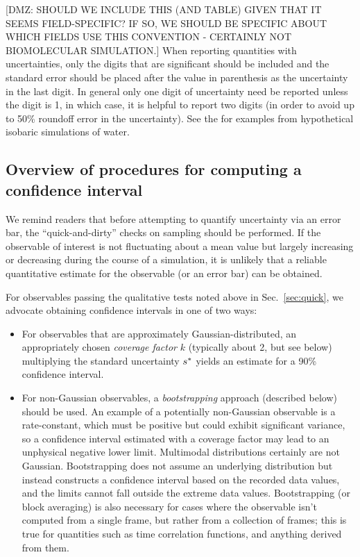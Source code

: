 [DMZ: SHOULD WE INCLUDE THIS (AND TABLE) GIVEN THAT IT SEEMS FIELD-SPECIFIC?  IF SO, WE SHOULD BE SPECIFIC ABOUT WHICH FIELDS USE THIS CONVENTION - CERTAINLY NOT BIOMOLECULAR SIMULATION.]
When reporting quantities with uncertainties, only the digits that are significant should be included and the standard error should be placed after the value in parenthesis as the uncertainty in the last digit.  In general only one digit of uncertainty need be reported unless the digit is 1, in which case, it is helpful to report two digits (in order to avoid up to 50\% roundoff error in the uncertainty).  See the  for examples from hypothetical isobaric simulations of water.


\subsection{Overview of procedures for computing a confidence interval}
We remind readers that before attempting to quantify uncertainty via an error bar, the ``quick-and-dirty'' checks on sampling should be performed.
If the observable of interest is not fluctuating about a mean value but largely increasing or decreasing during the course of a simulation, it is unlikely that a reliable quantitative estimate for the observable (or an error bar) can be obtained.

For observables passing the qualitative tests noted above in Sec.\ \ref{sec:quick}, we advocate obtaining confidence intervals in one of two ways:
\begin{itemize}
\item For observables that are approximately Gaussian-distributed, an appropriately chosen \emph{coverage factor} $k$ (typically about 2, but see below) multiplying the standard uncertainty $s^*$ yields an estimate for a 90\% confidence interval.
\item For non-Gaussian observables, a \emph{bootstrapping} approach (described below) should be used.  An example of a potentially non-Gaussian observable is a rate-constant, which must be positive but could exhibit significant variance, so a confidence interval estimated with a coverage factor may lead to an unphysical negative lower limit.  Multimodal distributions certainly are not Gaussian.  Bootstrapping does not assume an underlying distribution but instead constructs a confidence interval based on the recorded data values, and the limits cannot fall outside the extreme data values.  Bootstrapping (or block averaging) is also necessary for cases where the observable isn't computed from a single frame, but rather from a collection of frames; this is true for quantities such as time correlation functions, and anything derived from them.
\end{itemize}

